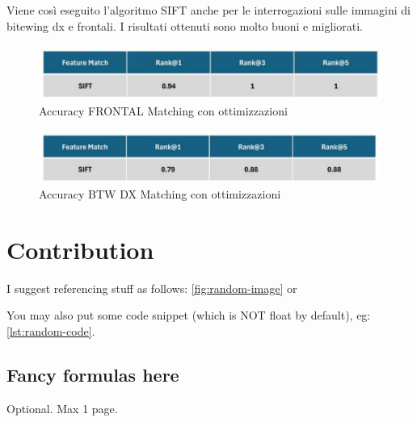 \documentclass[12pt,a4paper,openright,twoside]{book}
\begin{document}
Viene così eseguito l'algoritmo SIFT anche per le interrogazioni sulle immagini di bitewing dx e frontali. I risultati ottenuti sono molto buoni e migliorati.
\begin{figure}[H]
	\centering
	\includegraphics{figures/frontal6.pdf}
    	\caption{Accuracy FRONTAL Matching con ottimizzazioni}
	\label{fig:frontal6}
\end{figure}
\begin{figure}[H]
	\centering
	\includegraphics{figures/dx6.pdf}
    	\caption{Accuracy BTW DX Matching con ottimizzazioni}
	\label{fig:dx6}
\end{figure}


\chapter{Contribution}
I suggest referencing stuff as follows: \cref{fig:random-image} or 

You may also put some code snippet (which is NOT float by default), eg: \cref{lst:random-code}.



\section{Fancy formulas here}


\backmatter

\nocite{*} %




\begin{acknowledgements} %
Optional. Max 1 page.
\end{acknowledgements}
\end{document}
